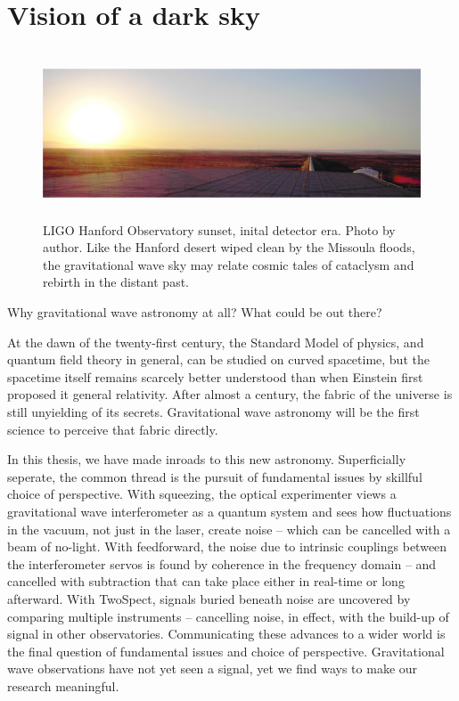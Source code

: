     \section{Vision of a dark sky}
    \label{dark_sky}

\begin{figure}
\begin{center}
\includegraphics[height=50mm,width=148mm]{LIGOpanoramasmall.eps}
\caption{LIGO Hanford Observatory sunset, inital detector era. Photo by author. Like the Hanford desert wiped clean by the Missoula floods, the gravitational wave sky may relate cosmic tales of cataclysm and rebirth in the distant past.}
\label{LIGO_panorama_small}
\end{center}
\end{figure}

        Why gravitational wave astronomy at all? What could be out there?

        At the dawn of the twenty-first century, the Standard Model of physics, and quantum field theory in general, can be studied on curved spacetime, but the spacetime itself remains scarcely better understood than when Einstein first proposed it general relativity. 
After almost a century, the fabric of the universe is still unyielding of its secrets. 
Gravitational wave astronomy will be the first science to perceive that fabric directly. 

        In this thesis, we have made inroads to this new astronomy. Superficially seperate, the common thread is the pursuit of fundamental issues by skillful choice of perspective. 
With squeezing, the optical experimenter views a gravitational wave interferometer as a quantum system and sees how fluctuations in the vacuum, not just in the laser, create noise -- which can be cancelled with a beam of no-light.
With feedforward, the noise due to intrinsic couplings between the interferometer servos is found by coherence in the frequency domain -- and cancelled with subtraction that can take place either in real-time or long afterward.
With TwoSpect, signals buried beneath noise are uncovered by comparing multiple instruments -- cancelling noise, in effect, with the build-up of signal in other observatories.
Communicating these advances to a wider world is the final question of fundamental issues and choice of perspective.
Gravitational wave observations have not yet seen a signal, yet we find ways to make our research meaningful.

